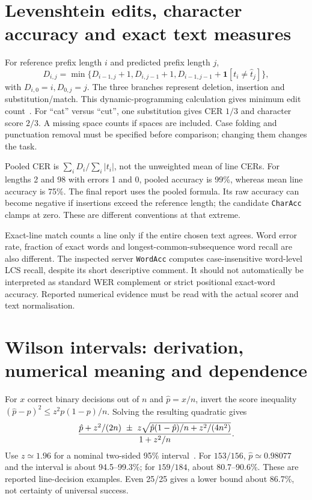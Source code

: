 \section{Levenshtein edits, character accuracy and exact text measures}
For reference prefix length $i$ and predicted prefix length $j$,
\[
D_{i,j}=\min\{D_{i-1,j}+1,D_{i,j-1}+1,
D_{i-1,j-1}+\mathbf1[t_i\ne\hat t_j]\},
\]
with $D_{i,0}=i,D_{0,j}=j$. The three branches represent deletion,
insertion and substitution/match. This dynamic-programming calculation gives
minimum edit count~\cite{levenshtein1966}. For ``cat'' versus ``cut'',
one substitution gives CER $1/3$ and character score $2/3$. A missing
space counts if spaces are included. Case folding and punctuation removal
must be specified before comparison; changing them changes the task.

Pooled CER is $\sum_iD_i/\sum_i|t_i|$, not the unweighted mean of line
CERs. For lengths 2 and 98 with errors 1 and 0, pooled accuracy is 99\%,
whereas mean line accuracy is 75\%. The final report uses the pooled
formula. Its raw accuracy can become negative if insertions exceed the
reference length; the candidate \texttt{CharAcc} clamps at zero. These are
different conventions at that extreme.

Exact-line match counts a line only if the entire chosen text agrees.
Word error rate, fraction of exact words and longest-common-subsequence
word recall are also different. The inspected server \texttt{WordAcc} computes
case-insensitive word-level LCS recall, despite its short descriptive comment.
It should not automatically be interpreted as standard WER complement or
strict positional exact-word accuracy. Reported numerical evidence must be
read with the actual scorer and text normalisation.

\section{Wilson intervals: derivation, numerical meaning and dependence}
For $x$ correct binary decisions out of $n$ and $\hat p=x/n$, invert the
score inequality $(\hat p-p)^2\le z^2p(1-p)/n$. Solving the resulting
quadratic gives
\[
{\hat p+z^2/(2n)\ \pm\ z\sqrt{\hat p(1-\hat p)/n+z^2/(4n^2)}
\over1+z^2/n}.
\]
Use $z\simeq1.96$ for a nominal two-sided 95\% interval~\cite{wilson1927,nistinterval}.
For $153/156$, $\hat p\simeq0.98077$ and the interval is about
94.5--99.3\%; for $159/184$, about 80.7--90.6\%. These are reported
line-decision examples. Even 25/25 gives a lower bound about 86.7\%, not
certainty of universal success.

